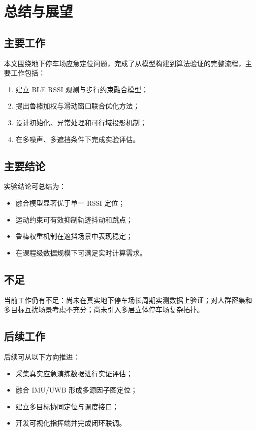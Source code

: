 \chapter{总结与展望}

\section{主要工作}
本文围绕地下停车场应急定位问题，完成了从模型构建到算法验证的完整流程，主要工作包括：
\begin{enumerate}
  \item 建立 BLE RSSI 观测与步行约束融合模型；
  \item 提出鲁棒加权与滑动窗口联合优化方法；
  \item 设计初始化、异常处理和可行域投影机制；
  \item 在多噪声、多遮挡条件下完成实验评估。
\end{enumerate}

\section{主要结论}
实验结论可总结为：
\begin{itemize}
  \item 融合模型显著优于单一 RSSI 定位；
  \item 运动约束可有效抑制轨迹抖动和跳点；
  \item 鲁棒权重机制在遮挡场景中表现稳定；
  \item 在课程级数据规模下可满足实时计算需求。
\end{itemize}

\section{不足}
当前工作仍有不足：尚未在真实地下停车场长周期实测数据上验证；对人群密集和多目标互扰场景考虑不充分；尚未引入多层立体停车场复杂拓扑。

\section{后续工作}
后续可从以下方向推进：
\begin{itemize}
  \item 采集真实应急演练数据进行实证评估；
  \item 融合 IMU/UWB 形成多源因子图定位；
  \item 建立多目标协同定位与调度接口；
  \item 开发可视化指挥端并完成闭环联调。
\end{itemize}
